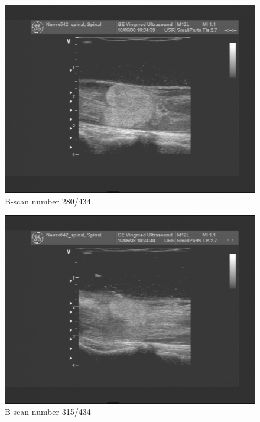 \begin{figure}[h]
\centering
\includegraphics[height=0.45\textheight]{graphics/280.png}
\caption{B-scan number 280/434}
\label{fig:280}
\end{figure}

\begin{figure}[h]
\centering
\includegraphics[height=0.45\textheight]{graphics/315.png}
\caption{B-scan number 315/434}
\label{fig:315}
\end{figure}

